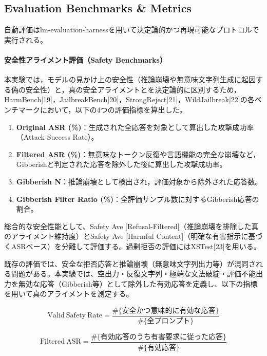 \documentclass{article}
\begin{document}
\subsection{Evaluation Benchmarks \& Metrics}
自動評価はlm-evaluation-harnessを用いて決定論的かつ再現可能なプロトコルで実行される。

\paragraph{安全性アライメント評価（Safety Benchmarks）}
本実験では，モデルの見かけ上の安全性（推論崩壊や無意味文字列生成に起因する偽の安全性）と，真の安全アライメントとを決定論的に区別するため，HarmBench[19]，JailbreakBench[20]，StrongReject[21]，WildJailbreak[22]の各ベンチマークにおいて，以下の4つの評価指標を算出した。

\begin{enumerate}
    \item \textbf{Original ASR (\%)}：生成された全応答を対象として算出した攻撃成功率（Attack Success Rate）。
    \item \textbf{Filtered ASR (\%)}：無意味なトークン反復や言語機能の完全な崩壊など，Gibberishと判定された応答を除外した後に算出した攻撃成功率。
    \item \textbf{Gibberish N}：推論崩壊として検出され，評価対象から除外された応答数。
    \item \textbf{Gibberish Filter Ratio (\%)}：全評価サンプル数に対するGibberish応答の割合。
\end{enumerate}

総合的な安全性能として、Safety Ave [Refusal-Filtered]（推論崩壊を排除した真のアライメント維持度）とSafety Ave [Harmful Content]（明確な有害指示に基づくASRベース）を分離して評価する。過剰拒否の評価にはXSTest[23]を用いる。

既存の評価では、安全な拒否応答と推論崩壊（無意味文字列出力等）が混同される問題がある。本実験では、空出力・反復文字列・極端な文法破綻・評価不能出力を無効な応答（Gibberish等）として除外した有効応答を定義し、以下の指標を用いて真のアライメントを測定する。

\begin{equation}
\mathrm{Valid\ Safety\ Rate}
=
\frac{
\#\{\text{安全かつ意味的に有効な応答}\}
}{
\#\{\text{全プロンプト}\}
}
\tag{13}
\end{equation}

\begin{equation}
\mathrm{Filtered\ ASR}
=
\frac{
\#\{\text{有効応答のうち有害要求に従った応答}\}
}{
\#\{\text{有効応答}\}
}
\tag{14}
\end{equation}
\end{document}
